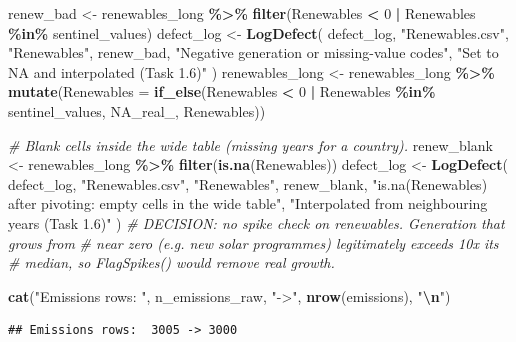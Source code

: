 \documentclass[
]{article}
\newenvironment{Shaded}{\begin{snugshade}}{\end{snugshade}}
\newcommand{\AttributeTok}[1]{\textcolor[rgb]{0.13,0.29,0.53}{#1}}
\newcommand{\CommentTok}[1]{\textcolor[rgb]{0.56,0.35,0.01}{\textit{#1}}}
\newcommand{\ConstantTok}[1]{\textcolor[rgb]{0.56,0.35,0.01}{#1}}
\newcommand{\DecValTok}[1]{\textcolor[rgb]{0.00,0.00,0.81}{#1}}
\newcommand{\FunctionTok}[1]{\textcolor[rgb]{0.13,0.29,0.53}{\textbf{#1}}}
\newcommand{\NormalTok}[1]{#1}
\newcommand{\OtherTok}[1]{\textcolor[rgb]{0.56,0.35,0.01}{#1}}
\newcommand{\SpecialCharTok}[1]{\textcolor[rgb]{0.81,0.36,0.00}{\textbf{#1}}}
\newcommand{\StringTok}[1]{\textcolor[rgb]{0.31,0.60,0.02}{#1}}
\begin{document}
\begin{Shaded}
\begin{Highlighting}[]
\NormalTok{renew\_bad }\OtherTok{\textless{}{-}}\NormalTok{ renewables\_long }\SpecialCharTok{\%\textgreater{}\%}
  \FunctionTok{filter}\NormalTok{(Renewables }\SpecialCharTok{\textless{}} \DecValTok{0} \SpecialCharTok{|}\NormalTok{ Renewables }\SpecialCharTok{\%in\%}\NormalTok{ sentinel\_values)}
\NormalTok{defect\_log }\OtherTok{\textless{}{-}} \FunctionTok{LogDefect}\NormalTok{(}
\NormalTok{  defect\_log, }\StringTok{"Renewables.csv"}\NormalTok{, }\StringTok{"Renewables"}\NormalTok{, renew\_bad,}
  \StringTok{"Negative generation or missing{-}value codes"}\NormalTok{,}
  \StringTok{"Set to NA and interpolated (Task 1.6)"}
\NormalTok{)}
\NormalTok{renewables\_long }\OtherTok{\textless{}{-}}\NormalTok{ renewables\_long }\SpecialCharTok{\%\textgreater{}\%}
  \FunctionTok{mutate}\NormalTok{(}\AttributeTok{Renewables =} \FunctionTok{if\_else}\NormalTok{(Renewables }\SpecialCharTok{\textless{}} \DecValTok{0} \SpecialCharTok{|}
\NormalTok{                                Renewables }\SpecialCharTok{\%in\%}\NormalTok{ sentinel\_values,}
                              \ConstantTok{NA\_real\_}\NormalTok{, Renewables))}

\CommentTok{\# Blank cells inside the wide table (missing years for a country).}
\NormalTok{renew\_blank }\OtherTok{\textless{}{-}}\NormalTok{ renewables\_long }\SpecialCharTok{\%\textgreater{}\%} \FunctionTok{filter}\NormalTok{(}\FunctionTok{is.na}\NormalTok{(Renewables))}
\NormalTok{defect\_log }\OtherTok{\textless{}{-}} \FunctionTok{LogDefect}\NormalTok{(}
\NormalTok{  defect\_log, }\StringTok{"Renewables.csv"}\NormalTok{, }\StringTok{"Renewables"}\NormalTok{, renew\_blank,}
  \StringTok{"is.na(Renewables) after pivoting: empty cells in the wide table"}\NormalTok{,}
  \StringTok{"Interpolated from neighbouring years (Task 1.6)"}
\NormalTok{)}
\CommentTok{\# DECISION: no spike check on renewables. Generation that grows from}
\CommentTok{\# near zero (e.g. new solar programmes) legitimately exceeds 10x its}
\CommentTok{\# median, so FlagSpikes() would remove real growth.}

\FunctionTok{cat}\NormalTok{(}\StringTok{"Emissions rows: "}\NormalTok{, n\_emissions\_raw, }\StringTok{"{-}\textgreater{}"}\NormalTok{, }\FunctionTok{nrow}\NormalTok{(emissions), }\StringTok{"}\SpecialCharTok{\textbackslash{}n}\StringTok{"}\NormalTok{)}
\end{Highlighting}
\end{Shaded}

\begin{verbatim}
## Emissions rows:  3005 -> 3000
\end{verbatim}
\end{document}
